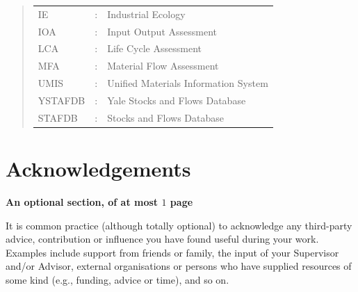\documentclass[ %
                    author={Tom Jager},
                supervisor={Dr. Daniel Schien},
                    degree={MEng},
                     title={A Bayesian Inference Engine for UMIS Structured Data},
                  subtitle={},
                      type={research},
                      year={2019} ]{dissertation}
\begin{document}
\begin{quote}
\noindent
\begin{tabular}{lcl}
IE                 &:     & Industrial Ecology                                         \\
IOA                &:     & Input Output Assessment
  \\
LCA                &:     & Life Cycle Assessment
  \\
MFA                &:     & Material Flow Assessment
  \\
UMIS               &:     & Unified Materials Information System
  \\
YSTAFDB            &:     & Yale Stocks and Flows Database
  \\
STAFDB             &:      &  Stocks and Flows Database
  \\
\end{tabular}
\end{quote}


\chapter*{Acknowledgements}

{\bf An optional section, of at most $1$ page}
\vspace{1cm} 

\noindent
It is common practice (although totally optional) to acknowledge any
third-party advice, contribution or influence you have found useful
during your work.  Examples include support from friends or family, 
the input of your Supervisor and/or Advisor, external organisations 
or persons who  have supplied resources of some kind (e.g., funding, 
advice or time), and so on.


%
\end{document}

